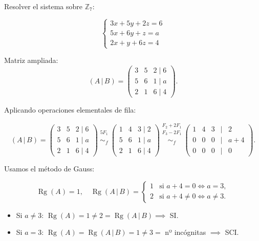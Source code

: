 \documentclass[a4paper,12pt]{article}
\begin{document}
\begin{ejemplo}[title=Ejemplo de sistema dependiente de un parámetro]
Resolver el sistema sobre $\mathbb{Z}_7$:

\[
\begin{cases}
3x + 5y + 2z = 6 \\
5x + 6y + z = a \\
2x + y + 6z = 4
\end{cases}
\]

Matriz ampliada:
\[
(A\,|\,B) =
\begin{pmatrix}
3 & 5 & 2 \;\Big|\; 6 \\
5 & 6 & 1 \;\Big|\; a \\
2 & 1 & 6 \;\Big|\; 4
\end{pmatrix}.
\]

Aplicando operaciones elementales de fila:

\[
(A\,|\,B) =
\begin{pmatrix}
3 & 5 & 2 \;\Big|\; 6 \\
5 & 6 & 1 \;\Big|\; a \\
2 & 1 & 6 \;\Big|\; 4
\end{pmatrix}
\overset{\substack{5 F_1 \\{}}}{\sim_f}
\begin{pmatrix}
1 & 4 & 3 \;\Big|\; 2 \\
5 & 6 & 1 \;\Big|\; a \\
2 & 1 & 6 \;\Big|\; 4
\end{pmatrix}
\overset{\substack{F_2 + 2 F_1 \\ F_3 - 2 F_1 \\{}}}{\sim_f}
\begin{pmatrix}
1 & 4 & 3 &\Big| &2 \\
0 & 0 & 0 &\Big| &a+4 \\
0 & 0 & 0 &\Big| &0
\end{pmatrix}.
\]

\vspace{0.5em}

Usamos el método de Gauss:

\[
\operatorname{Rg}(A) = 1, \quad
\operatorname{Rg}(A\,|\,B) =
\begin{cases}
1 & \text{si } a+4 = 0 \iff a = 3,\\
2 & \text{si } a+4 \neq 0 \iff a \neq 3.
\end{cases}
\]

\begin{itemize}
    \item Si $a \neq 3$: $\operatorname{Rg}(A) = 1 \neq 2 = \operatorname{Rg}(A\,|\,B) \implies$ SI.
    \item Si $a = 3$: $\operatorname{Rg}(A) = \operatorname{Rg}(A\,|\,B) = 1 \neq 3 = $ nº incógnitas $\implies$ SCI.
\end{itemize}


\end{ejemplo}
\end{document}
